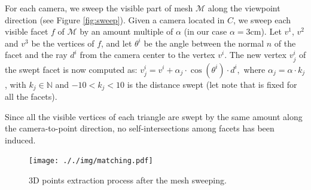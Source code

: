 For each camera, we sweep the visible part of mesh $\mathcal{M}$ along the viewpoint direction (see Figure \ref{fig:sweep}). 
Given a camera located in $C$, we sweep each visible facet $f$ of $\mathcal{M}$ by an amount multiple of $\alpha$ (in our case $\alpha = 3$cm).
Let $v^1$, $v^2$ and $v^3$ be the vertices of $f$, and let $\theta^i$ be the angle between the normal $n$ of the facet and the ray $d^i$ from the camera center to the vertex $v^i$. 
The new vertex $v_j^i$ of the swept facet is now computed as:
$
v_j^i = v^i + \alpha_j \cdot \cos (\theta^i) \cdot d^i,
$
where $\alpha_j = \alpha \cdot k_j$, with $k_j \in \mathbb{N}$ and $-10< k_j <10$ is the distance swept (let note that is fixed for all the facets).

Since all the visible vertices of each triangle are swept by the same amount along the camera-to-point direction, no self-intersections among facets has been induced. 


% 

\begin{figure}[t]
  \centering
  \texttt{[image: ././img/matching.pdf]}
\caption{3D points extraction process after the mesh sweeping.}
  \label{fig:matching}
\end{figure}

